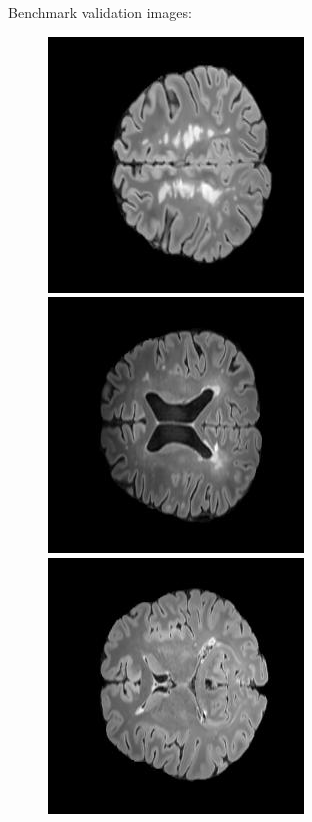 \begin{figure}[!htb]
\end{figure}

Benchmark validation images: 
\begin{figure}[!htb]
    \includegraphics[width=.32\textwidth]{images/ts_images/ts175_input.jpg}\hfill
    \includegraphics[width=.32\textwidth]{images/ts_images/ts431_input.jpg}\hfill
    \includegraphics[width=.32\textwidth]{images/ts_images/ts687_input.jpg}
    \hfill

\end{figure}
